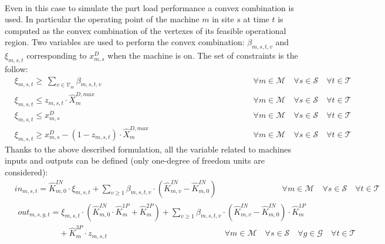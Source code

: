 \documentclass{article}
\newcommand{\cT}{{\mathcal T}}
\newcommand{\cM}{{\mathcal M}}
\newcommand{\cS}{{\mathcal S}}
\newcommand{\cV}{{\mathcal V}}
\newcommand{\cG}{{\mathcal G}}
\begin{document}
{\begin{align}
		\end{align}
Even in this case to simulate the part load performance a convex combination is used. In particular the operating point of the machine $m$ in  site $s$ at time $t$ is computed as the convex combination of the vertexes of its feasible operational region.  
Two variables are used to perform the convex combination: $\beta_{m,s,t,v}$ and $\xi_{m,s,t}$ corresponding to $x_{m,s}^D$ when the machine is on. The set of constraints is the follow: 		
		\begin{align}
		& \xi_{m,s,t} \ge\ \sum_{v \in \cV_m} \beta_{m,s,t,v} & \hspace{5cm} \forall m \in \cM \quad \forall s \in \cS \quad \forall t \in \cT \label{eq:Xi_beta_link}\\
		& \xi_{m,s,t} \leq z_{m,s,t} \cdot \hat{X}_{m}^{D,max} & \hspace{5cm} \forall m \in \cM \quad \forall s \in \cS \quad \forall t \in \cT \label{eq:Xi_active1}\\
		& \xi_{m,s,t} \leq x_{m,s}^D & \hspace{5cm} \forall m \in \cM \quad \forall s \in \cS \quad \forall t \in \cT \label{eq:Xi_active2}\\
		& \xi_{m,s,t} \geq x_{m,s}^D - (1-z_{m,s,t}) \cdot \hat{X}_{m}^{D,max} & \hspace{5cm} \forall m \in \cM \quad \forall s \in \cS \quad \forall t \in \cT \label{eq:Xi_active3}
		\end{align}	
Thanks to the above described formulation, all the variable related to machines inputs and outputs can be defined (only one-degree of freedom units are considered):
		\begin{align}
		& in_{m,s,t} = \hat{K}_{m,0}^{IN} \cdot \xi_{m,s,t} + \sum_{v \geq 1} \beta_{m,s,t,v} \cdot (\hat{K}_{m,v}^{IN} - \hat{K}_{m,0}^{IN} ) & \hspace{3cm} \forall m \in \cM \quad \forall s \in \cS \quad \forall t \in \cT \label{eq:in}
		\end{align}
		\begin{align}
		\begin{split}
		& out_{m,s,g,t} =  \xi_{m,s,t} \cdot \left( \hat{K}_{m,0}^{IN} \cdot \hat{K}_{m}^{1P} + \hat{K}_{m}^{2P} \right) + \sum_{v \geq 1} \beta_{m,s,t,v} \cdot (\hat{K}_{m,v}^{IN} - \hat{K}_{m,0}^{IN}) \cdot \hat{K}_{m}^{1P} \\ & \qquad \qquad \quad + \hat{K}_{m}^{3P} \cdot z_{m,s,t} \hspace{6cm} \forall m \in \cM \quad \forall s \in \cS \quad \forall g \in \cG \quad \forall t \in \cT \label{eq:out}\\

\end{split}
\end{align}}
\end{document}
